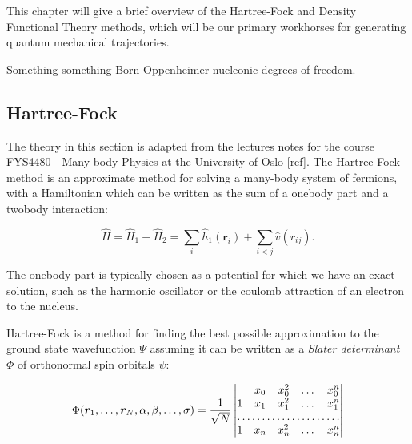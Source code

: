 This chapter will give a brief overview of the Hartree-Fock
and Density Functional Theory methods, which will be our primary workhorses
for generating quantum mechanical trajectories.
\par
Something something Born-Oppenheimer nucleonic degrees of freedom.


\subsection{Hartree-Fock}
The theory in this section is adapted from the lectures notes
for the course FYS4480 - Many-body Physics at the University of Oslo [ref].
The Hartree-Fock method is an approximate method for solving
a many-body system of fermions, with a Hamiltonian 
which can be written as the sum of a onebody part and a twobody interaction:

$$ \hat{H} = \hat{H}_1 + \hat{H}_2 =
\sum_i \hat{h}_1 (\bm{r}_i) + \sum_{i < j} \hat{v}(r_{ij}) . $$

The onebody part is typically chosen as a potential for which
we have an exact solution, such as the harmonic oscillator
or the coulomb attraction of an electron to the nucleus.
\par
Hartree-Fock is a method for finding the best possible
approximation to the ground state wavefunction $\Psi$
assuming it can be written as a \textit{Slater determinant} $\Phi$
of orthonormal spin orbitals $\psi$:

\begin{equation}
\Phi(\bm{r}_1,\dots,\bm{r}_N, \alpha, \beta, \dots, \sigma)
= \frac{1}{\sqrt{N}}
\begin{vmatrix}
 & x_{0} & x_{0}^{2} & \dots & x_{0}^{n} \\ 
1 & x_{1} & x_{1}^{2} & \dots & x_{1}^{n} \\
\hdotsfor{5} \\
1 & x_{n} & x_{n}^{2} & \dots & x_{n}^{n}
\end{vmatrix}
\end{equation}
